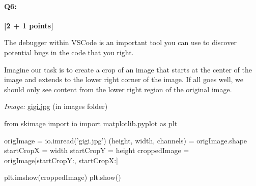 \documentclass[11pt]{article}
\begin{document}
\pagebreak
\paragraph{Q6:} \textbf{[2 + 1 points]}

The debugger within VSCode is an important tool you can use to discover potential bugs in the code that you right.

Imagine our task is to create a crop of an image that starts at the center of the image and extends to the lower right corner of the image. If all goes well, we should only see content from the lower right region of the original image.

\emph{Image:} \href{images/gigi.jpg}{gigi.jpg} (in images folder)

\begin{python}
from skimage import io
import matplotlib.pyplot as plt

origImage = io.imread('gigi.jpg')
(height, width, channels) = origImage.shape
startCropX = width %
startCropY = height %
croppedImage = origImage[startCropY:, startCropX:]

plt.imshow(croppedImage)
plt.show()
\end{python}
\end{document}
